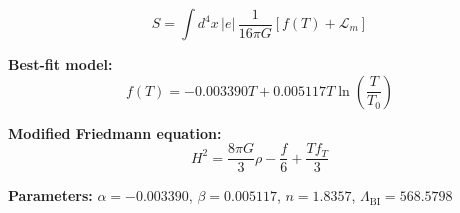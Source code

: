 
\begin{equation}
  S = \int d^4x \, |e| \, \frac{1}{16\pi G} \left[ f(T) + \mathcal{L}_m \right]
\end{equation}

\textbf{Best-fit model:}
\begin{equation}
  f(T) = -0.003390 T + 0.005117 T \ln\!\left(\frac{T}{T_0}\right)
\end{equation}

\textbf{Modified Friedmann equation:}
\begin{equation}
  H^2 = \frac{8\pi G}{3} \rho - \frac{f}{6} + \frac{T f_T}{3}
\end{equation}

\textbf{Parameters:}
$\alpha = -0.003390$, \quad
$\beta = 0.005117$, \quad
$n = 1.8357$, \quad
$\Lambda_{\text{BI}} = 568.5798$
